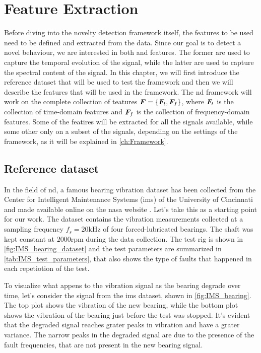\chapter{Feature Extraction}
\label{ch:FeatureExtraction}

Before diving into the novelty detection framework itself, the features to be used need to be defined and extracted from the data. Since our goal is to detect a novel behaviour, we are interested in both  and  features. The former are used to capture the temporal evolution of the signal, while the latter are used to capture the spectral content of the signal. 
In this chapter, we will first introduce the reference dataset that will be used to test the framework and then we will describe the features that will be used in the framework. The \gls{nd} framework will work on the complete collection of teatures $\bm{F}=\{\bm{F}_t, \bm{F}_f\}$, where $\bm{F}_t$ is the collection of time-domain features and $\bm{F}_f$ is the collection of frequency-domain features. Some of the featires will be extracted for all the signals available, while some other only on a subset of the signals, depending on the settings of the framework, as it will be explained in \autoref{ch:Framework}. 



\section{Reference dataset}
In the field of \gls{nd}, a famous bearing vibration dataset has been collected from the Center for Intelligent Maintenance Systems (\gls{ims}) of the University of Cincinnati and made available online on the \gls{nasa} website \cite{lee2007bearingdataset}. 
Let's take this as a starting point for our work. The dataset contains the vibration measurements collected at a sampling frequency $f_s=20\si{\kHz}$ of four forced-lubricated bearings. The shaft was kept constant at $2000$rpm during the data collection. The test rig is shown in \autoref{fig:IMS_bearing_dataset} and the test parameters are summarized in \autoref{tab:IMS_test_parameters}, that also shows the type of faults that happened in each repetiotion of the test.

To visualize what appens to the vibration signal as the bearing degrade over time, let's consider the  signal from the \gls{ims} dataset, shown in \autoref{fig:IMS_bearing}. The top plot shows the vibration of the new bearing, while the bottom plot shows the vibration of the bearing just before the test was stopped. It's evident that the degraded signal reaches grater peaks in vibration and have a grater variance. The narrow peaks in the degraded signal are due to the presence of the fault frequencies, that are not present in the new bearing signal.


